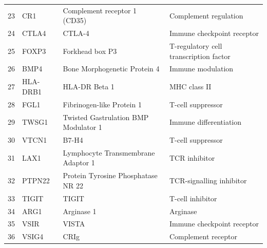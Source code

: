 \begin{longtable}{|p{1cm}|p{2.5cm}|p{4cm}|p{4cm}|}
	23 & CR1       & Complement receptor 1 (CD35)         & Complement regulation \\
	24 & CTLA4     & CTLA-4                               & Immune checkpoint receptor \\
	25 & FOXP3     & Forkhead box P3                      & T-regulatory cell transcription factor \\
	26 & BMP4      & Bone Morphogenetic Protein 4         & Immune modulation \\
	27 & HLA-DRB1  & HLA-DR Beta 1                        & MHC class II \\
	28 & FGL1      & Fibrinogen-like Protein 1            & T-cell suppressor \\
	29 & TWSG1     & Twisted Gastrulation BMP Modulator 1 & Immune differentiation \\
	30 & VTCN1     & B7-H4                                & T-cell suppressor \\
	31 & LAX1      & Lymphocyte Transmembrane Adaptor 1   & TCR inhibitor \\
	32 & PTPN22    & Protein Tyrosine Phosphatase NR 22   & TCR-signalling inhibitor \\
	33 & TIGIT     & TIGIT                                & T-cell inhibitor \\
	34 & ARG1      & Arginase 1                           & Arginase \\
	35 & VSIR      & VISTA                                & Immune checkpoint receptor \\
	36 & VSIG4     & CRIg                                 & Complement receptor \\
	
\end{longtable}

